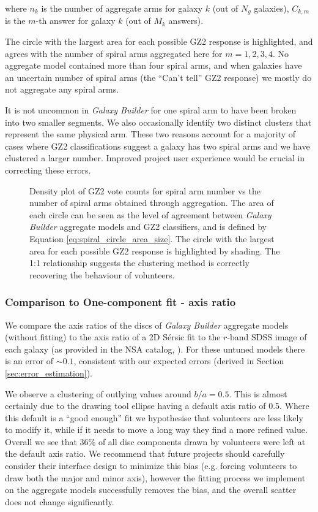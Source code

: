 \documentclass[../main.tex]{subfiles}
\begin{document}
where $n_k$ is the number of aggregate arms for galaxy $k$ (out of $N_g$ galaxies), $C_{k, m}$ is the $m$-th answer for galaxy $k$ (out of $M_k$ answers).

The circle with the largest area for each possible GZ2 response is highlighted, and agrees with the number of spiral arms aggregated here for $m=1, 2, 3, 4$. No aggregate model contained more than four spiral arms, and when galaxies have an uncertain number of spiral arms (the ``Can't tell'' GZ2 response) we mostly do not aggregate any spiral arms.

It is not uncommon in \textit{Galaxy Builder} for one spiral arm to have been broken into two smaller segments. We also occasionally identify two distinct clusters that represent the same physical arm. These two reasons account for a majority of cases where GZ2 classifications suggest a galaxy has two spiral arms and we have clustered a larger number. Improved project user experience would be crucial in correcting these errors.

\begin{figure}
  \caption{Density plot of GZ2 vote counts for spiral arm number vs the number of spiral arms obtained through aggregation. The area of each circle can be seen as the level of agreement between \textit{Galaxy Builder} aggregate models and GZ2 classifiers, and is defined by Equation \ref{eq:spiral_circle_area_size}. The circle with the largest area for each possible GZ2 response is highlighted by shading. The 1:1 relationship suggests the clustering method is correctly recovering the behaviour of volunteers.}
  \label{fig:n_spirals_comparison}
\end{figure}


\subsubsection{Comparison to One-component fit - axis ratio}

We compare the axis ratios of the discs of \textit{Galaxy Builder} aggregate models (without fitting) to the axis ratio of a 2D S\'ersic fit to the $r$-band SDSS image of each galaxy (as provided in the NSA catalog, \citealt{2011AJ....142...31B}). For these untuned models there is an error of $\sim0.1$, consistent with our expected errors (derived in Section \ref{sec:error_estimation}).

We observe a clustering of outlying values around $b/a=0.5$. This is almost certainly due to the drawing tool ellipse having a default axis ratio of 0.5. Where this default is a ``good enough'' fit we hypothesise that volunteers are less likely to modify it, while if it needs to move a long way they find a more refined value. Overall we see that 36\% of all disc components drawn by volunteers were left at the default axis ratio. We recommend that future projects should carefully consider their interface design to minimize this bias (e.g. forcing volunteers to draw both the major and minor axis), however the fitting process we implement on the aggregate models successfully removes the bias, and the overall scatter does not change significantly.
\end{document}
